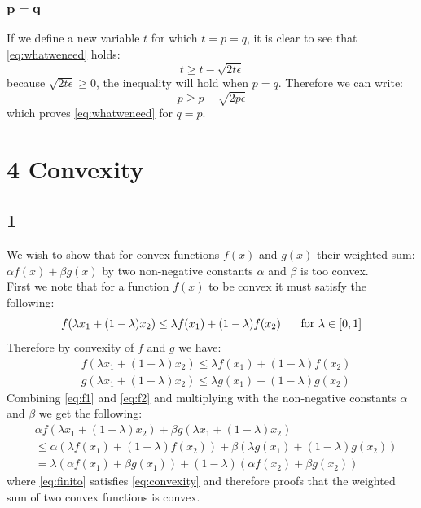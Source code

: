 \documentclass{article}
\begin{document}
\subsubsection{$\mathbf{p = q}$}
If we define a new variable $t$ for which $t=p=q$, it is clear to see that \eqref{eq:whatweneed} holds:
\begin{equation}
t \geq t - \sqrt{2 t \epsilon}
\end{equation}
because $\sqrt{2 t \epsilon} \geq 0$, the inequality will hold when $p=q$. Therefore we can write:
\begin{equation}
p \geq p - \sqrt{2 p \epsilon}
\end{equation}
which proves \eqref{eq:whatweneed} for $q=p$.
\section{4 Convexity}
\subsection{1}
We wish to show that for convex functions $f(x)$ and $g(x)$ their weighted sum: $\alpha f(x) + \beta g(x)$ by two non-negative constants $\alpha$ and $\beta$ is too convex. \\
First we note that for a function $f(x)$ to be convex it must satisfy the following:
\begin{equation}
\label{eq:convexity}
f(\lambda x_1+(1-\lambda)x_2) \leq \lambda f(x_1) + (1-\lambda)f(x_2) \text{\hspace{0.5cm}     for } \lambda \in [0,1]
\end{equation}
Therefore by convexity of $f$ and $g$ we have:
\begin{align}
\label{eq:f1}
&f(\lambda x_1+(1- \lambda )x_2) \leq \lambda f(x_1) + (1- \lambda )f(x_2) \\
\label{eq:f2}
&g(\lambda x_1+(1-\lambda)x_2) \leq \lambda g(x_1) + (1- \lambda )g(x_2)
\end{align}
Combining \eqref{eq:f1} and \eqref{eq:f2} and multiplying with the non-negative constants $\alpha$ and $\beta$ we get the following:
\begin{align}
&\alpha f(\lambda x_1 + (1-\lambda) x_2) + \beta g( \lambda x_1 + (1 - \lambda) x_2)\\
&\leq \alpha ( \lambda f(x_1) + (1 - \lambda) f(x_2)) + \beta ( \lambda g (x_1) + (1 - \lambda ) g (x_2)) \\
\label{eq:finito}
&= \lambda(\alpha f(x_1) + \beta g(x_1)) + ( 1 - \lambda) (\alpha f(x_2) + \beta g(x_2)) 
\end{align}
where \eqref{eq:finito} satisfies \eqref{eq:convexity} and therefore proofs that the weighted sum of two convex functions is convex.
\end{document}
